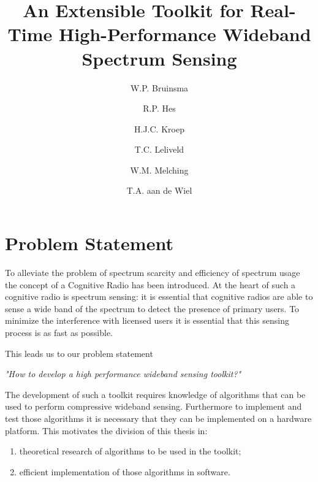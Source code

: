 \documentclass[a4paper, openany, oneside]{memoir}
\title{An Extensible Toolkit for Real-Time High-Performance Wideband Spectrum Sensing}
\author{W.P. Bruinsma \and R.P. Hes \and H.J.C. Kroep \and T.C. Leliveld \and W.M. Melching \and T.A. aan de Wiel}
\begin{document}
\chapter{Problem Statement} \label{cha:problem_statement}
To alleviate the problem of spectrum scarcity and efficiency of spectrum usage the concept of a Cognitive Radio has been introduced.
At the heart of such a cognitive radio is spectrum sensing: it is essential that cognitive radios are able to sense a wide band of the spectrum to detect the presence of primary users. To minimize the interference with licensed users it is essential that this sensing process is as fast as possible.

This leads us to our problem statement 

\emph{"How to develop a high performance wideband sensing toolkit?"}

The development of such a toolkit requires knowledge of algorithms that can be used to perform compressive wideband sensing. Furthermore
to implement and test those algorithms it is necessary that they can be implemented on a hardware platform. This motivates the division of this thesis in:

\begin{enumerate}
	\item theoretical research of algorithms to be used in the toolkit;
	\item efficient implementation of those algorithms  in software.
\end{enumerate}
\end{document}
